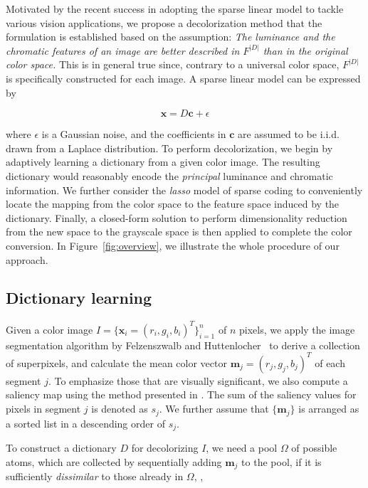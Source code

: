 Motivated by the recent success in adopting the sparse linear model
to tackle various vision applications, we propose a decolorization method 
that the formulation is established based on the assumption: 
{\em The luminance and the chromatic features of an image 
are better described in $F^{|D|}$ than in the original color space.}
This is in general true since, contrary to a universal color space, 
$F^{|D|}$ is specifically constructed for each image. 
A sparse linear model can be expressed by

\begin{equation}
\mathbf{x} = D \mathbf{c} + \epsilon
\label{eqn:sparse}
\end{equation}

\noindent where $\epsilon$ is a Gaussian noise, 
and the coefficients in $\mathbf{c}$ are assumed to be i.i.d. 
drawn from a Laplace distribution. 
To perform decolorization, we begin by adaptively learning a dictionary 
from a given color image. 
The resulting dictionary would reasonably encode the {\em principal} luminance 
and chromatic information. 
We further consider the {\em lasso} model \cite{Tibshirani94} of sparse coding
to conveniently locate the mapping from the color space to the feature space 
induced by the dictionary. 
Finally, a closed-form solution to perform dimensionality reduction 
from the new space to the grayscale space is then applied to complete the color conversion.
In Figure~\ref{fig:overview}, we illustrate the whole procedure of our approach.

%
\subsection{Dictionary learning}
\label{sec:dict}
%

Given a color image $I = \{\mathbf{x}_i = (r_i, g_i, b_i)^T\}_{i=1}^n$ of $n$ pixels, 
we apply the image segmentation algorithm by Felzenszwalb and 
Huttenlocher~\cite{Felzenszwalb:2004:EGI} to derive a collection of superpixels, 
and calculate the mean color vector $ \mathbf{m}_j = (r_j, g_j, b_j)^T$ of each segment $j$.
To emphasize those that are visually significant, 
we also compute a saliency map using the method presented in \cite{Goferman10}.
The sum of the saliency values for pixels in segment $j$ is denoted as $s_j$. 
We further assume that $\{ \mathbf{m}_j\}$ is arranged as a sorted list 
in a descending order of $s_j$.

To construct a dictionary $D$ for decolorizing $I$, we need a pool $\Omega$ 
of possible atoms, which are collected by sequentially adding $\mathbf{m}_j$ to the pool,
if it is sufficiently {\em dissimilar} to those already in $\Omega$, \ie,

